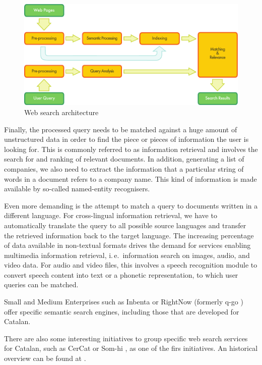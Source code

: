 \begin{multicols}{2}
\begin{figure}[htb]
  \center
  \includegraphics[width=\textwidth]{../_media/english/web_search_architecture}
  \caption{Web search architecture}
  \label{fig:websearcharch_en}
 \end{figure}

Finally, the processed query needs to be matched against a huge amount of unstructured data in order to find the piece or pieces of information the user is looking for. This is commonly referred to as information retrieval and involves the search for and ranking of relevant documents. In addition, generating a list of companies, we also need to extract the information that a particular string of words in a document refers to a company name. This kind of information is made available by so-called named-entity recognisers. 

Even more demanding is the attempt to match a query to documents written in a different language. For cross-lingual information retrieval, we have to automatically translate the query to all possible source languages and transfer the retrieved information back to the target language. The increasing percentage of data available in non-textual formats drives the demand for services enabling multimedia information retrieval, i.\,e.~information search on images, audio, and video data. For audio and video files, this involves a speech recognition module to convert speech content into text or a phonetic representation, to which user queries can be matched.

Small and Medium Enterprises such as Inbenta \cite{CAT-inbenta} or RightNow (formerly q-go \cite{CAT-rightnow}) offer specific semantic search engines, including those that are developed for Catalan.

There are also some interesting initiatives to group specific web search services for Catalan, such as CerCat or Som-hi \cite{CAT-cercadors}, as one of the firs initiatives. An historical overview can be found at \cite{CAT-Resum-sobre-cercadors}.


\end{multicols}
